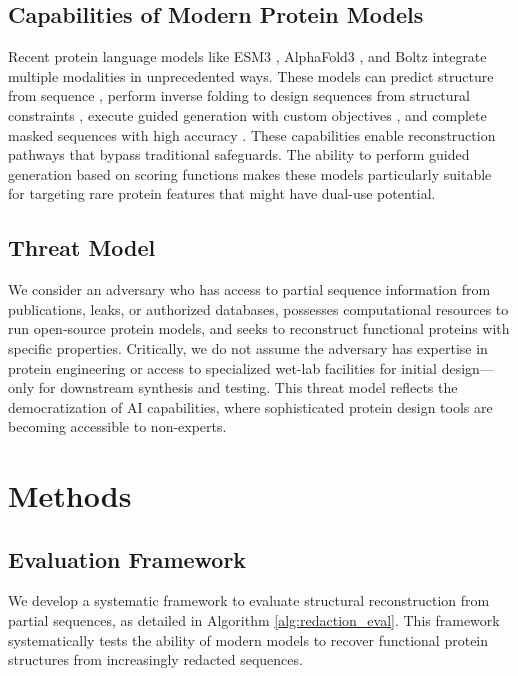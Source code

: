 \documentclass{article}
\begin{document}
\subsection{Capabilities of Modern Protein Models}

Recent protein language models like ESM3 \cite{hayes2025simulating}, AlphaFold3 \cite{abramson2024accurate}, and Boltz \cite{wohlwend2024boltz} integrate multiple modalities in unprecedented ways. These models can predict structure from sequence \cite{lin2023evolutionary}, perform inverse folding to design sequences from structural constraints \cite{hsu2022learning}, execute guided generation with custom objectives \cite{ingraham2019generative,rao2021msa}, and complete masked sequences with high accuracy \cite{rao2019transformer}. These capabilities enable reconstruction pathways that bypass traditional safeguards. The ability to perform guided generation based on scoring functions makes these models particularly suitable for targeting rare protein features that might have dual-use potential.

\subsection{Threat Model}

We consider an adversary who has access to partial sequence information from publications, leaks, or authorized databases, possesses computational resources to run open-source protein models, and seeks to reconstruct functional proteins with specific properties. Critically, we do not assume the adversary has expertise in protein engineering or access to specialized wet-lab facilities for initial design—only for downstream synthesis and testing. This threat model reflects the democratization of AI capabilities, where sophisticated protein design tools are becoming accessible to non-experts.

\section{Methods}

\subsection{Evaluation Framework}

We develop a systematic framework to evaluate structural reconstruction from partial sequences, as detailed in Algorithm \ref{alg:redaction_eval}. This framework systematically tests the ability of modern models to recover functional protein structures from increasingly redacted sequences.
\end{document}

